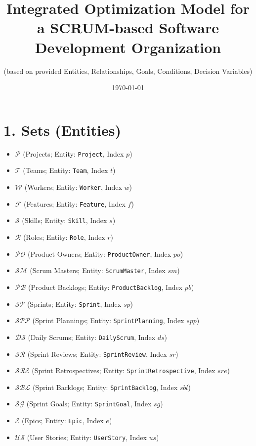 \documentclass[11pt,a4paper]{article}
\title{Integrated Optimization Model for a SCRUM-based Software Development Organization}
\author{(based on provided Entities, Relationships, Goals, Conditions, Decision Variables)}
\date{\today}
\begin{document}
\maketitle
\tableofcontents
\newpage

\section{1. Sets (Entities)}
\begin{itemize}[leftmargin=2em]
  \item $\mathcal{P}$ (Projects; Entity: \texttt{Project}, Index $p$)
  \item $\mathcal{T}$ (Teams; Entity: \texttt{Team}, Index $t$)
  \item $\mathcal{W}$ (Workers; Entity: \texttt{Worker}, Index $w$)
  \item $\mathcal{F}$ (Features; Entity: \texttt{Feature}, Index $f$)
  \item $\mathcal{S}$ (Skills; Entity: \texttt{Skill}, Index $s$)
  \item $\mathcal{R}$ (Roles; Entity: \texttt{Role}, Index $r$)
  \item $\mathcal{PO}$ (Product Owners; Entity: \texttt{ProductOwner}, Index $po$)
  \item $\mathcal{SM}$ (Scrum Masters; Entity: \texttt{ScrumMaster}, Index $sm$)
  \item $\mathcal{PB}$ (Product Backlogs; Entity: \texttt{ProductBacklog}, Index $pb$)
  \item $\mathcal{SP}$ (Sprints; Entity: \texttt{Sprint}, Index $sp$)
  \item $\mathcal{SPP}$ (Sprint Plannings; Entity: \texttt{SprintPlanning}, Index $spp$)
  \item $\mathcal{DS}$ (Daily Scrums; Entity: \texttt{DailyScrum}, Index $ds$)
  \item $\mathcal{SR}$ (Sprint Reviews; Entity: \texttt{SprintReview}, Index $sr$)
  \item $\mathcal{SRE}$ (Sprint Retrospectives; Entity: \texttt{SprintRetrospective}, Index $sre$)
  \item $\mathcal{SBL}$ (Sprint Backlogs; Entity: \texttt{SprintBacklog}, Index $sbl$)
  \item $\mathcal{SG}$ (Sprint Goals; Entity: \texttt{SprintGoal}, Index $sg$)
  \item $\mathcal{E}$ (Epics; Entity: \texttt{Epic}, Index $e$)
  \item $\mathcal{US}$ (User Stories; Entity: \texttt{UserStory}, Index $us$)

\end{itemize}
\end{document}
